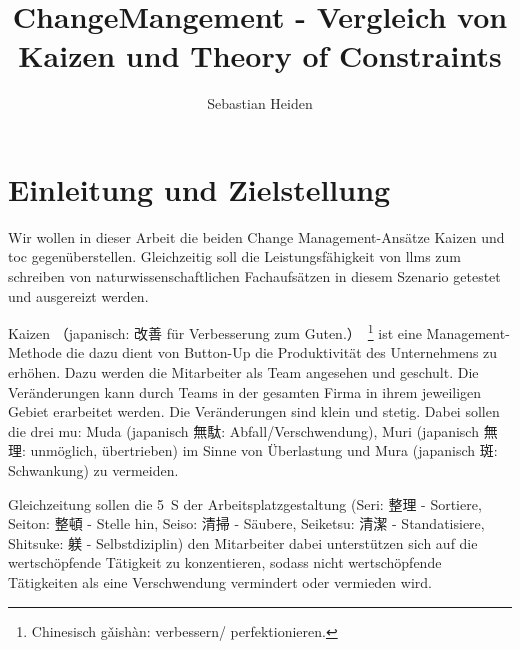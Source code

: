 \documentclass[acmlarge,authorversion,nonacm]{acmart}
\begin{document}
	\title{ChangeMangement - Vergleich von Kaizen und Theory of Constraints}
	
	\author{Sebastian Heiden}

\begin{abstract}

\end{abstract}




\maketitle

\section{Einleitung und Zielstellung}

Wir wollen in dieser Arbeit die beiden Change Management-Ansätze Kaizen und \gls{toc} gegenüberstellen.
Gleichzeitig soll die Leistungsfähigkeit von \glspl{llm} zum schreiben von naturwissenschaftlichen Fachaufsätzen in diesem Szenario getestet und ausgereizt werden.

Kaizen （japanisch: 改善 für Verbesserung zum Guten.）~\footnote{Chinesisch gǎishàn: verbessern/ perfektionieren.} ist eine Management-Methode die dazu dient von Button-Up die Produktivität des Unternehmens zu erhöhen.
Dazu werden die Mitarbeiter als Team angesehen und geschult. Die Veränderungen kann durch Teams in der gesamten Firma in ihrem jeweiligen Gebiet erarbeitet werden.
Die Veränderungen sind klein und stetig. Dabei sollen die drei mu: Muda (japanisch 無駄: Abfall/Verschwendung), Muri (japanisch 無理: unmöglich, übertrieben) im Sinne von Überlastung und Mura (japanisch 斑: Schwankung) zu vermeiden.~\cite{helmold_kaizen_2021}

Gleichzeitung sollen die 5~S der Arbeitsplatzgestaltung (Seri: 整理 - Sortiere, Seiton: 整頓 - Stelle hin, Seiso: 清掃 - Säubere, Seiketsu: 清潔 - Standatisiere, Shitsuke:  躾 - Selbstdiziplin) den Mitarbeiter dabei unterstützen sich auf die wertschöpfende Tätigkeit zu konzentieren, sodass nicht wertschöpfende Tätigkeiten als eine Verschwendung vermindert oder vermieden wird.
\end{document}
